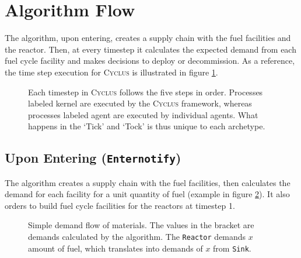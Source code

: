 \documentclass[11pt,letterpaper]{article}
\newcommand{\Cyclus}{\textsc{Cyclus}\xspace}%
\begin{document}
\section{Algorithm Flow}

The algorithm, upon entering, creates a supply chain with the fuel facilities and
the reactor. Then, at every timestep it calculates the expected demand from each fuel cycle
facility and makes decisions to deploy or decommission. As a reference, the time step
execution for \Cyclus is illustrated in figure \ref{diag:time}.

\begin{figure}[H]
\centering
{}
\caption{Each timestep in \Cyclus follows the five steps in order. Processes labeled
         kernel are executed by the \Cyclus framework, whereas processes labeled agent
         are executed by individual agents. What happens in the `Tick' and `Tock' is
         thus unique to each archetype.}
\label{diag:time}
\end{figure}

\subsection{Upon Entering (\texttt{Enternotify})}

The algorithm creates a supply chain with the fuel facilities,
then calculates the demand for each facility for a unit quantity of fuel
(example in figure \ref{diag:dem}). It also orders to build fuel cycle
facilities for the reactors at timestep 1.

\begin{figure}[H]
\centering
{}
\caption{Simple demand flow of materials. The values in the bracket are demands calculated
         by the algorithm. The \texttt{Reactor} demands $x$ amount of fuel,
         which translates into demands of $x$ from  \texttt{Sink}.}
\label{diag:dem}
\end{figure}
\end{document}
